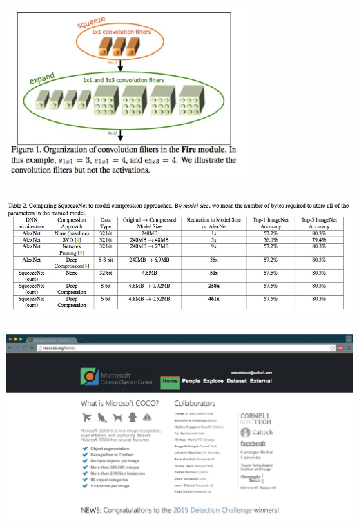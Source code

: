 \documentclass[xetex,mathserif,serif,aspectratio=169]{beamer}
\begin{document}
\begin{frame}[fragile] \frametitle{} \oldB \small

\begin{center}
\includegraphics[width=0.7\textwidth]{img/squeezeNetFire.jpg}
\end{center}

\end{frame}

\begin{frame}[fragile] \frametitle{} \oldB \small

\begin{center}
\includegraphics[width=\textwidth]{img/squeezeNetResults.jpg}
\end{center}

\end{frame}

\begin{frame}[fragile] \frametitle{} \oldB \small

\textbf{}

\begin{center}
\includegraphics[width=\textwidth]{img/mscocoWeb.jpg}
\end{center}

\end{frame}
\end{document}
